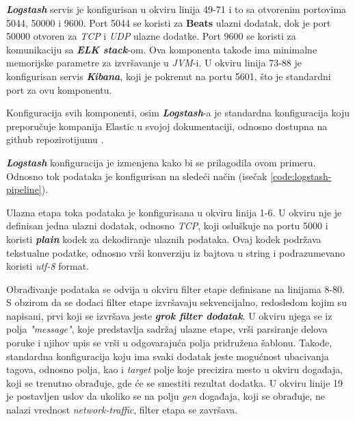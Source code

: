 \par
\textit{\textbf{Logstash}} servis je konfigurisan u okviru linija 49-71 i to sa otvorenim portovima 5044, 50000 i 9600. Port 5044 se koristi za \textbf{Beats} ulazni dodatak, dok je port 50000 otvoren za \textit{TCP} i \textit{UDP} ulazne dodatke. Port 9600 se koristi za komunikaciju sa \textit{\textbf{ELK stack}}-om. Ova komponenta takođe ima minimalne memorijske parametre za izvršavanje u \textit{JVM}-i. U okviru linija 73-88 je konfigurisan servis \textit{\textbf{Kibana}}, koji je pokrenut na portu 5601, što je standardni port za ovu komponentu.

\par
Konfiguracija svih komponenti, osim \textit{\textbf{Logstash}}-a je standardna konfiguracija koju preporučuje kompanija Elastic u svojoj dokumentaciji, odnosno dostupna na github repozirotijumu \cite{elk-docker-compose-repo}.

\par
\textit{\textbf{Logstash}} konfiguracija je izmenjena kako bi se prilagodila ovom primeru. Odnosno tok podataka je konfigurisan na sledeći način (isečak \ref{code:logstash-pipeline}).


\par
Ulazna etapa toka podataka je konfigurisana u okviru linija 1-6. U okviru nje je definisan jedna ulazni dodatak, odnosno \textit{TCP}, koji osluškuje na portu 5000 i koristi \textit{\textbf{plain}} kodek za dekodiranje ulaznih podataka. Ovaj kodek podržava tekstualne podatke, odnosno vrši konverziju iz bajtova u string i podrazumevano koristi \textit{utf-8} format.

\par
Obrađivanje podataka se odvija u okviru filter etape definisane na linijama 8-80. S obzirom da se dodaci filter etape izvršavaju sekvencijalno, redosledom kojim su napisani, prvi koji se izvršava jeste \textit{\textbf{grok filter dodatak}}. U okviru njega se iz polja \textit{"message"}, koje predstavlja sadržaj ulazne etape, vrši parsiranje delova poruke i njihov upis se vrši u odgovarajuća polja pridružena šablonu. Takođe, standardna konfiguracija koju ima svaki dodatak jeste mogućnost ubacivanja tagova, odnosno polja, kao i \textit{target} polje koje precizira mesto u okviru događaja, koji se trenutno obrađuje, gde će se smestiti rezultat dodatka. U okviru linije 19 je postavljen uslov da ukoliko se na polju \textit{gen} događaja, koji se obrađuje, ne nalazi vrednost \textit{network-traffic}, filter etapa se završava.

